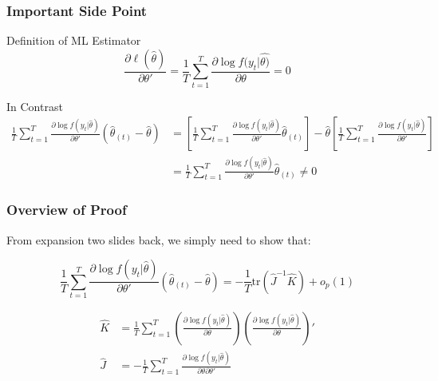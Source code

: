 \begin{frame}
  \frametitle{Important Side Point}

  \begin{block}{Definition of ML Estimator}
    \[
      \frac{\partial \ell(\widehat{\theta})}{\partial \theta'} = \frac{1}{T}\sum_{t=1}^T \frac{\partial \log f(y_t|\widehat{\theta)}}{\partial \theta} = 0
    \]
  \end{block}

  \begin{alertblock}{In Contrast}
    \footnotesize
    \begin{align*}
      \frac{1}{T}\sum_{t=1}^T \frac{\partial \log f(y_t|\widehat{\theta})}{\partial \theta'}\left(\widehat{\theta}_{(t)} - \widehat{\theta} \right) &= 
      \left[\frac{1}{T}\sum_{t=1}^T \frac{\partial \log f(y_t|\widehat{\theta})}{\partial \theta'} \widehat{\theta}_{(t)}\right] - \widehat{\theta}\left[\frac{1}{T}\sum_{t=1}^T \frac{\partial \log f(y_t|\widehat{\theta})}{\partial \theta'}\right]\\
      &= \frac{1}{T}\sum_{t=1}^T \frac{\partial \log f(y_t|\widehat{\theta})}{\partial \theta'} \widehat{\theta}_{(t)} \neq 0
    \end{align*}
  \end{alertblock}

\end{frame}
\begin{frame} 
  \frametitle{Overview of Proof}
  
From expansion two slides back, we simply need to show that:
\vspace{-1em}

\[\frac{1}{T}\sum_{t=1}^T \frac{\partial \log f(y_t|\widehat{\theta})}{\partial \theta'}\left(\widehat{\theta}_{(t)} - \widehat{\theta} \right) = -\frac{1}{T}\mbox{tr}\left(\widehat{J}^{-1} \widehat{K} \right) + o_p(1)\]

\small
\begin{align*}
  \widehat{K}&= \frac{1}{T}\sum_{t=1}^T \left(\frac{\partial \log f(y_t|\widehat{\theta})}{\partial \theta}\right) \left(\frac{\partial \log f(y_t|\widehat{\theta})}{\partial \theta}\right)' \\
  \widehat{J} &= -\frac{1}{T}\sum_{t=1}^T \frac{\partial\log f(y_t|\widehat{\theta})}{\partial\theta \partial \theta'}
\end{align*}
\end{frame}

